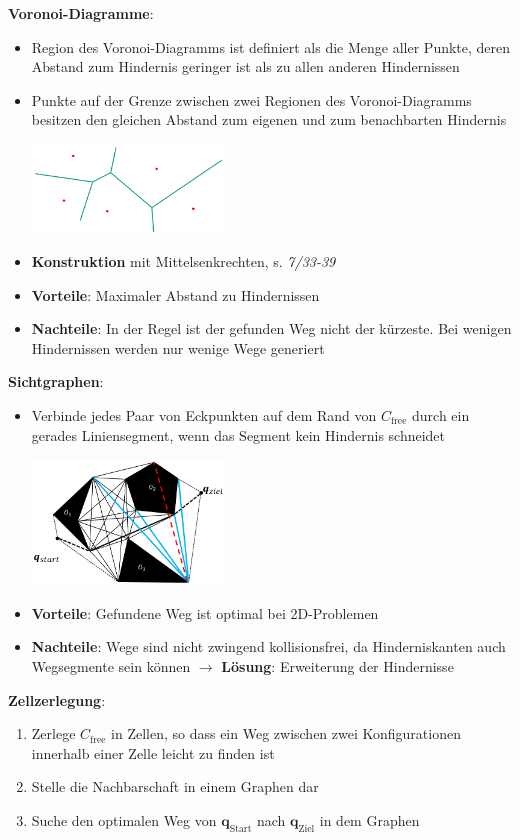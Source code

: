 \textbf{Voronoi-Diagramme}: 
\begin{itemize}
	\item Region des Voronoi-Diagramms ist definiert als die Menge aller Punkte, deren Abstand zum Hindernis geringer ist als zu allen anderen Hindernissen
	\item Punkte auf der Grenze zwischen zwei Regionen des Voronoi-Diagramms besitzen den gleichen Abstand zum eigenen und zum benachbarten Hindernis
	\begin{center}
		\includegraphics[width=0.4\textwidth]{images/voronoi.png}
	\end{center}
	\item \textbf{Konstruktion} mit Mittelsenkrechten, s. \textit{7/33-39}
	\item \textbf{Vorteile}: Maximaler Abstand zu Hindernissen
	\item \textbf{Nachteile}: In der Regel ist der gefunden Weg nicht der kürzeste. Bei wenigen Hindernissen werden nur wenige Wege generiert
\end{itemize}
\pagebreak
\textbf{Sichtgraphen}:
\begin{itemize}
	\item Verbinde jedes Paar von Eckpunkten auf dem Rand von $C_\text{free}$ durch ein gerades Liniensegment, wenn das Segment kein Hindernis schneidet
	\begin{center}
		\includegraphics[width=0.4\textwidth]{images/sichtgraph.png}
	\end{center}
	\item \textbf{Vorteile}: Gefundene Weg ist optimal bei 2D-Problemen
	\item \textbf{Nachteile}: Wege sind nicht zwingend kollisionsfrei, da Hinderniskanten auch Wegsegmente sein können $\rightarrow$ \textbf{Lösung}: Erweiterung der Hindernisse
\end{itemize}
\bigskip
\textbf{Zellzerlegung}:
\begin{enumerate}
	\item Zerlege $C_\text{free}$ in Zellen, so dass ein Weg zwischen zwei Konfigurationen innerhalb einer Zelle leicht zu finden ist
	\item Stelle die Nachbarschaft in einem Graphen dar
	\item Suche den optimalen Weg von $\mathbf{q}_\text{Start}$ nach $\mathbf{q}_\text{Ziel}$ in dem Graphen
\end{enumerate}

